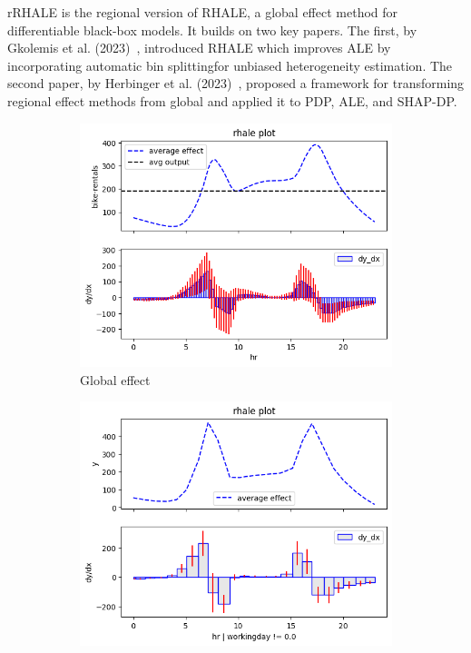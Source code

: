 \documentclass[
twocolumn,
]{ceurart}
\begin{document}
rRHALE is the regional version of RHALE, a global effect method for differentiable black-box models. It builds on two key papers. The first, by Gkolemis et al. (2023)~\citep{gkolemis2023rhale}, introduced RHALE which improves ALE by incorporating automatic bin splittingfor unbiased heterogeneity estimation. The second paper, by Herbinger et al. (2023)~\citep{herbinger2023decomposing}, proposed a framework for transforming regional effect methods from global and applied it to PDP, ALE, and SHAP-DP.


\begin{figure}
  \centering
  \begin{subfigure}[t]{0.32\textwidth}
  \centering
  \includegraphics[width=\linewidth]{figures/running_example/01_bike_sharing_dataset_23_1.png}
  \caption{Global effect}
  \label{subfig:global}
  \end{subfigure}
  \begin{subfigure}[t]{0.32\textwidth}
  \centering
  \includegraphics[width=\linewidth]{figures/running_example/01_bike_sharing_dataset_29_1.png}

\end{subfigure}
\end{figure}
\end{document}
